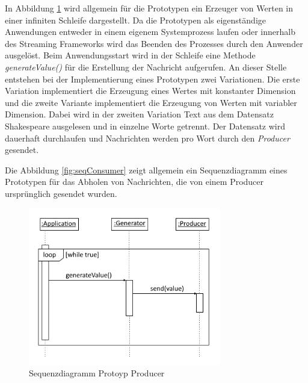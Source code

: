In Abbildung \ref{fig:seqProducer} wird allgemein für die Prototypen ein Erzeuger von Werten in einer infiniten Schleife dargestellt. Da die Prototypen als eigenständige Anwendungen entweder in einem eigenem Systemprozess laufen oder innerhalb des Streaming Frameworks wird das Beenden des Prozesses durch den Anwender ausgelöst. Beim Anwendungsstart wird in der Schleife eine Methode \textit{generateValue()} für die Erstellung der Nachricht aufgerufen. An dieser Stelle entstehen bei der Implementierung eines Prototypen zwei Variationen. Die erste Variation implementiert die Erzeugung eines Wertes mit konstanter Dimension und die zweite Variante implementiert die Erzeugung von Werten mit variabler Dimension.  Dabei wird in der zweiten Variation Text aus dem Datensatz Shakespeare  ausgelesen und in einzelne Worte getrennt. Der Datensatz wird dauerhaft durchlaufen und Nachrichten werden pro Wort durch den \textit{Producer} gesendet.

Die Abbildung \ref{fig:seqConsumer} zeigt allgemein ein Sequenzdiagramm eines Prototypen für das Abholen von Nachrichten, die von einem Producer ursprünglich gesendet wurden.



\begin{figure}[htb!]
\centering
\includegraphics[width=0.75\textwidth]{bilder/sequenceProducer.png}
\caption{Sequenzdiagramm Protoyp Producer
\label{fig:seqProducer}}
\end{figure}


